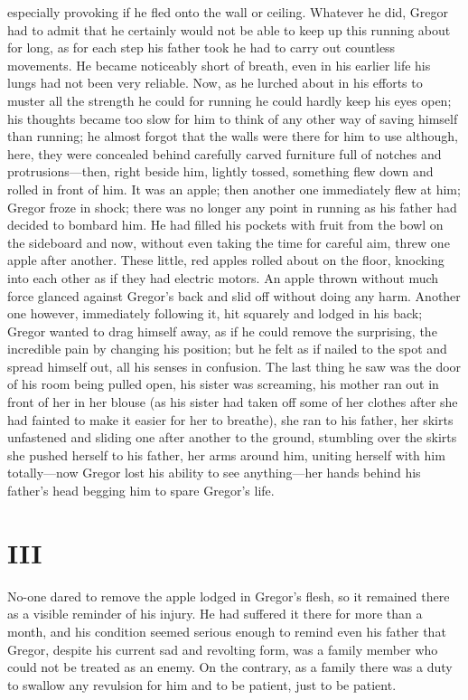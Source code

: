 especially provoking if he fled onto the wall or ceiling. Whatever he
did, Gregor had to admit that he certainly would not be able to keep up
this running about for long, as for each step his father took he had to
carry out countless movements. He became noticeably short of breath,
even in his earlier life his lungs had not been very reliable. Now, as
he lurched about in his efforts to muster all the strength he could for
running he could hardly keep his eyes open; his thoughts became too
slow for him to think of any other way of saving himself than running;
he almost forgot that the walls were there for him to use although,
here, they were concealed behind carefully carved furniture full of
notches and protrusions—then, right beside him, lightly tossed,
something flew down and rolled in front of him. It was an apple; then
another one immediately flew at him; Gregor froze in shock; there was
no longer any point in running as his father had decided to bombard
him. He had filled his pockets with fruit from the bowl on the
sideboard and now, without even taking the time for careful aim, threw
one apple after another. These little, red apples rolled about on the
floor, knocking into each other as if they had electric motors. An
apple thrown without much force glanced against Gregor’s back and slid
off without doing any harm. Another one however, immediately following
it, hit squarely and lodged in his back; Gregor wanted to drag himself
away, as if he could remove the surprising, the incredible pain by
changing his position; but he felt as if nailed to the spot and spread
himself out, all his senses in confusion. The last thing he saw was the
door of his room being pulled open, his sister was screaming, his
mother ran out in front of her in her blouse (as his sister had taken
off some of her clothes after she had fainted to make it easier for her
to breathe), she ran to his father, her skirts unfastened and sliding
one after another to the ground, stumbling over the skirts she pushed
herself to his father, her arms around him, uniting herself with him
totally—now Gregor lost his ability to see anything—her hands behind
his father’s head begging him to spare Gregor’s life.




\chapter{III}


No-one dared to remove the apple lodged in Gregor’s flesh, so it
remained there as a visible reminder of his injury. He had suffered it
there for more than a month, and his condition seemed serious enough to
remind even his father that Gregor, despite his current sad and
revolting form, was a family member who could not be treated as an
enemy. On the contrary, as a family there was a duty to swallow any
revulsion for him and to be patient, just to be patient.

